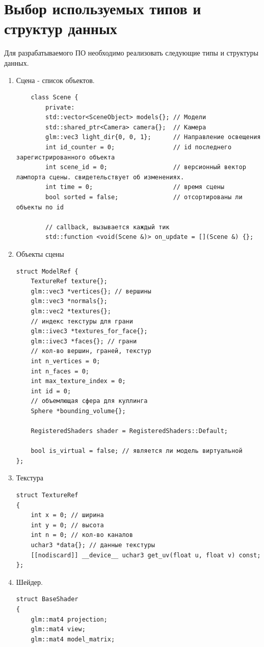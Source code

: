 \section{Выбор используемых типов и структур данных} 

Для разрабатываемого ПО необходимо реализовать следующие типы и структуры данных.
\begin{enumerate}
	\item Сцена - список объектов.
	
	\begin{verbatim}
	class Scene {
		private:
		std::vector<SceneObject> models{}; // Модели
		std::shared_ptr<Camera> camera{};  // Камера
		glm::vec3 light_dir{0, 0, 1};      // Направление освещения
		int id_counter = 0;                // id последнего зарегистрированного объекта
		int scene_id = 0;                  // версионный вектор лампорта сцены. свидетельствует об изменениях.
		int time = 0;                      // время сцены
		bool sorted = false;               // отсортированы ли объекты по id

		// callback, вызывается каждый тик
		std::function <void(Scene &)> on_update = [](Scene &) {}; 
	\end{verbatim}

	\item Объекты сцены
	
		\begin{Verbatim}[tabsize=4]
struct ModelRef {
	TextureRef texture{};
	glm::vec3 *vertices{}; // вершины
	glm::vec3 *normals{};
	glm::vec2 *textures{};
	// индекс текстуры для грани
	glm::ivec3 *textures_for_face{};
	glm::ivec3 *faces{}; // грани
	// кол-во вершин, граней, текстур
	int n_vertices = 0;
	int n_faces = 0;
	int max_texture_index = 0;
	int id = 0;
	// объемлющая сфера для куллинга
	Sphere *bounding_volume{};

	RegisteredShaders shader = RegisteredShaders::Default;

	bool is_virtual = false; // является ли модель виртуальной
};
	\end{Verbatim}
		
	\item Текстура
	\begin{Verbatim}
struct TextureRef
{
	int x = 0; // ширина
	int y = 0; // высота 
	int n = 0; // кол-во каналов
	uchar3 *data{}; // данные текстуры
	[[nodiscard]] __device__ uchar3 get_uv(float u, float v) const;
};
	\end{Verbatim}

	\item Шейдер.
	\begin{Verbatim}
struct BaseShader
{
	glm::mat4 projection;
	glm::mat4 view;
	glm::mat4 model_matrix;


\end{Verbatim}
\end{enumerate}
